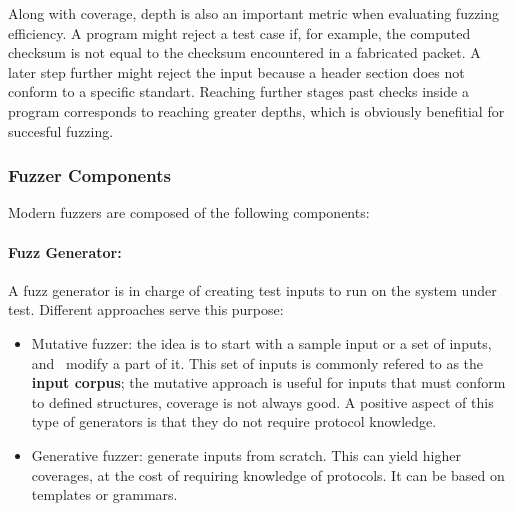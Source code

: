 







Along with coverage, depth is also an important metric when evaluating fuzzing efficiency. A program
might reject a test case if, for example, the computed checksum is not equal to the checksum encountered
in a fabricated packet. A later step further might reject the input because a header section does not conform
to a specific standart. Reaching further stages past  checks inside a program corresponds to reaching greater
depths, which is obviously benefitial for succesful fuzzing.

\subsubsection{Fuzzer Components}

Modern fuzzers are composed of the following components:

\paragraph{Fuzz Generator:}

A fuzz generator is in charge of creating test inputs to run on the system under test. Different
approaches serve this purpose\cite{mcnallyFuzzingStateArt2012}:

\begin{itemize}\label{ss:fuzzer-components}
    \item Mutative fuzzer: the idea is to start with a sample input or a set of inputs, and \
    modify a part of it. This set of inputs is commonly refered to as the \textbf{input corpus}; the mutative approach is useful for inputs that must conform to defined structures, coverage is not
    always good. A positive aspect of this type of generators is that they do not require protocol knowledge.
    \item Generative fuzzer: generate inputs from scratch. This can yield higher coverages, at the cost of requiring
    knowledge of protocols. It can be based on templates or grammars.
\end{itemize}

